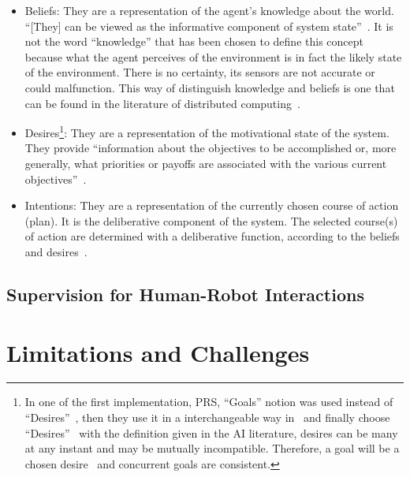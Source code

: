 \documentclass[a4paper,11pt,twoside]{StyleThese}
\begin{document}
\begin{itemize}
	\item Beliefs: They are a representation of the agent’s knowledge about the world. ``[They] can be viewed as the informative component of system state''~\cite{rao_1995_bdi}. It is not the word ``knowledge'' that has been chosen to define this concept because what the agent perceives of the environment is in fact the likely state of the environment. There is no certainty, its sensors are not accurate or could malfunction. This way of distinguish knowledge and beliefs is one that can be found in the literature of distributed computing~\cite{lamarre_1994_knowledge}.
	\item Desires\footnote{In one of the first implementation, PRS, ``Goals'' notion was used instead of ``Desires''~\cite{georgeff_1989_decision}, then they use it in a interchangeable way in~\cite{georgeff_1991_modeling} and finally choose ``Desires''~\cite{rao_1995_bdi} with the definition given in the AI literature, \eg desires can be many at any instant and may be mutually incompatible. Therefore, a goal will be a chosen desire~\cite{cohen_1990_intention} and concurrent goals are consistent.}: They are a representation of the motivational state of the system. They provide ``information about the objectives to be accomplished or, more generally, what priorities or payoffs are associated with the various current objectives''~\cite{rao_1995_bdi}. 
	\item Intentions: They are a representation of the currently chosen course of action (plan). It is the deliberative component of the system. The selected course(s) of action are determined with a deliberative function, according to the beliefs and desires~\cite{rao_1995_bdi}.
\end{itemize}
\subsection{Supervision for Human-Robot Interactions}

\section{Limitations and Challenges}




\ifdefined{}
\else


\end{document}
